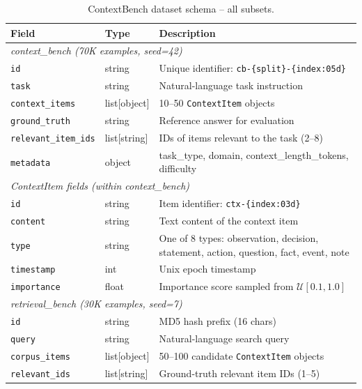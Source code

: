 \begin{table}[h!]
\centering
\caption{ContextBench dataset schema -- all subsets.}
\label{tab:app_dataset_schema}
\small
\begin{tabular}{@{}llp{6cm}@{}}
\toprule
\textbf{Field} & \textbf{Type} & \textbf{Description} \\
\midrule
\multicolumn{3}{l}{\textit{context\_bench (70K examples, seed=42)}} \\
\midrule
\texttt{id}               & string       & Unique identifier: \texttt{cb-\{split\}-\{index:05d\}} \\
\texttt{task}             & string       & Natural-language task instruction \\
\texttt{context\_items}   & list[object] & 10--50 \texttt{ContextItem} objects \\
\texttt{ground\_truth}    & string       & Reference answer for evaluation \\
\texttt{relevant\_item\_ids} & list[string] & IDs of items relevant to the task (2--8) \\
\texttt{metadata}         & object       & task\_type, domain, context\_length\_tokens, difficulty \\
\midrule
\multicolumn{3}{l}{\textit{ContextItem fields (within context\_bench)}} \\
\midrule
\texttt{id}               & string       & Item identifier: \texttt{ctx-\{index:03d\}} \\
\texttt{content}          & string       & Text content of the context item \\
\texttt{type}             & string       & One of 8 types: observation, decision, statement, action, question, fact, event, note \\
\texttt{timestamp}        & int          & Unix epoch timestamp \\
\texttt{importance}       & float        & Importance score sampled from $\mathcal{U}[0.1, 1.0]$ \\
\midrule
\multicolumn{3}{l}{\textit{retrieval\_bench (30K examples, seed=7)}} \\
\midrule
\texttt{id}               & string       & MD5 hash prefix (16 chars) \\
\texttt{query}            & string       & Natural-language search query \\
\texttt{corpus\_items}    & list[object] & 50--100 candidate \texttt{ContextItem} objects \\
\texttt{relevant\_ids}    & list[string] & Ground-truth relevant item IDs (1--5) \\

\end{tabular}
\end{table}
